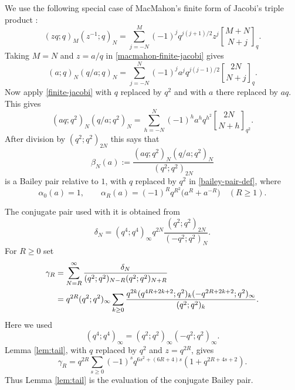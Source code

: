 \documentclass[11pt]{amsart}
\theoremstyle{remark}
\newcommand{\qbinom}[3][]{\genfrac{[}{]}{0pt}{}{#2}{#3}_{#1}}
\begin{document}
We use the following special case of MacMahon's finite form of Jacobi's triple product \cite[p.~75]{MacMahon}:
\begin{equation}\label{macmahon-finite-jacobi}
(zq;q)_M(z^{-1};q)_N
=
\sum_{j=-N}^{M}(-1)^j q^{j(j+1)/2}z^j
\qbinom[q]{M+N}{N+j}.
\end{equation}
Taking $M=N$ and $z=a/q$ in \eqref{macmahon-finite-jacobi} gives
\begin{equation}\label{finite-jacobi}
(a;q)_N(q/a;q)_N
=
\sum_{j=-N}^{N}(-1)^j a^j q^{j(j-1)/2}
\qbinom[q]{2N}{N+j}.
\end{equation}
Now apply \eqref{finite-jacobi} with $q$ replaced by $q^2$ and with $a$ there replaced by $aq$.  This gives
\begin{equation}\label{twovar-finite-jacobi}
(aq;q^2)_N(q/a;q^2)_N
=
\sum_{h=-N}^{N}(-1)^h a^h q^{h^2}
\qbinom[q^2]{2N}{N+h}.
\end{equation}
After division by $(q^2;q^2)_{2N}$ this says that
\begin{equation}\label{beta-a}
\beta_N(a):=\frac{(aq;q^2)_N(q/a;q^2)_N}{(q^2;q^2)_{2N}}
\end{equation}
is a Bailey pair relative to $1$, with $q$ replaced by $q^2$ in \eqref{bailey-pair-def}, where
\begin{equation}\label{alpha-a}
\alpha_0(a)=1,
\qquad
\alpha_R(a)=(-1)^Rq^{R^2}\big(a^R+a^{-R}\big)\quad(R\ge1).
\end{equation}

The conjugate pair used with it is obtained from
\begin{equation}\label{delta-def}
\delta_N=(q^4;q^4)_\infty q^{2N}
\frac{(q^2;q^2)_{2N}}{(-q^2;q^2)_N}.
\end{equation}
For $R\ge0$ set
\begin{align}
\gamma_R
&=\sum_{N=R}^{\infty}
\frac{\delta_N}{(q^2;q^2)_{N-R}(q^2;q^2)_{N+R}} \notag\\
&=q^{2R}(q^2;q^2)_\infty
\sum_{k\ge0}
\frac{q^{2k}(q^{4R+2k+2};q^2)_k(-q^{2R+2k+2};q^2)_\infty}
{(q^2;q^2)_k}. \label{gamma-tail-sum}
\end{align}
Here we used
\[
(q^4;q^4)_\infty=(q^2;q^2)_\infty(-q^2;q^2)_\infty.
\]
Lemma \ref{lem:tail}, with $q$ replaced by $q^2$ and $z=q^{2R}$, gives
\begin{equation}\label{gamma-eval}
\gamma_R=q^{2R}
\sum_{s\ge0}(-1)^sq^{6s^2+(6R+4)s}(1+q^{2R+4s+2}).
\end{equation}
Thus Lemma \ref{lem:tail} is the evaluation of the conjugate Bailey pair.
\end{document}
